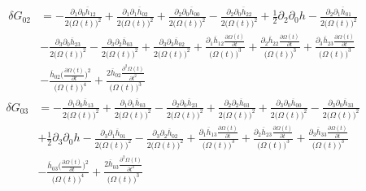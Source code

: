 \documentclass[10pt,letterpaper]{article}
\begin{document}
\begin{align}
	\delta G_{02} &= - \frac{\partial_{1}\partial_{0}\overline{h}_{12}}{2 \bigl(\Omega(t)\bigr)^2} + \frac{\partial_{1}\partial_{1}\overline{h}_{02}}{2 \bigl(\Omega(t)\bigr)^2} + \frac{\partial_{2}\partial_{0}\overline{h}_{00}}{2 \bigl(\Omega(t)\bigr)^2} -  \frac{\partial_{2}\partial_{0}\overline{h}_{22}}{2 \bigl(\Omega(t)\bigr)^2} + \tfrac{1}{2} \partial_{2}\partial_{0}h -  \frac{\partial_{2}\partial_{1}\overline{h}_{01}}{2 \bigl(\Omega(t)\bigr)^2}\\
& -  \frac{\partial_{3}\partial_{0}\overline{h}_{23}}{2 \bigl(\Omega(t)\bigr)^2} -  \frac{\partial_{3}\partial_{2}\overline{h}_{03}}{2 \bigl(\Omega(t)\bigr)^2} + \frac{\partial_{3}\partial_{3}\overline{h}_{02}}{2 \bigl(\Omega(t)\bigr)^2} + \frac{\partial_{1}\overline{h}_{12} \frac{\partial \Omega(t)}{\partial t}}{\bigl(\Omega(t)\bigr)^3} + \frac{\partial_{2}\overline{h}_{22} \frac{\partial \Omega(t)}{\partial t}}{\bigl(\Omega(t)\bigr)^3} + \frac{\partial_{3}\overline{h}_{23} \frac{\partial \Omega(t)}{\partial t}}{\bigl(\Omega(t)\bigr)^3} \\
&-  \frac{\overline{h}_{02} \bigl(\frac{\partial \Omega(t)}{\partial t}\bigr)^2}{\bigl(\Omega(t)\bigr)^4} + \frac{2 \overline{h}_{02} \frac{\partial^{2}\Omega(t)}{\partial t^{2}}}{\bigl(\Omega(t)\bigr)^3}
\end{align}
\begin{align}
	\delta G_{03} &= - \frac{\partial_{1}\partial_{0}\overline{h}_{13}}{2 \bigl(\Omega(t)\bigr)^2} + \frac{\partial_{1}\partial_{1}\overline{h}_{03}}{2 \bigl(\Omega(t)\bigr)^2} -  \frac{\partial_{2}\partial_{0}\overline{h}_{23}}{2 \bigl(\Omega(t)\bigr)^2} + \frac{\partial_{2}\partial_{2}\overline{h}_{03}}{2 \bigl(\Omega(t)\bigr)^2} + \frac{\partial_{3}\partial_{0}\overline{h}_{00}}{2 \bigl(\Omega(t)\bigr)^2} -  \frac{\partial_{3}\partial_{0}\overline{h}_{33}}{2 \bigl(\Omega(t)\bigr)^2} \\
&+ \tfrac{1}{2} \partial_{3}\partial_{0}h -  \frac{\partial_{3}\partial_{1}\overline{h}_{01}}{2 \bigl(\Omega(t)\bigr)^2} -  \frac{\partial_{3}\partial_{2}\overline{h}_{02}}{2 \bigl(\Omega(t)\bigr)^2} + \frac{\partial_{1}\overline{h}_{13} \frac{\partial \Omega(t)}{\partial t}}{\bigl(\Omega(t)\bigr)^3} + \frac{\partial_{2}\overline{h}_{23} \frac{\partial \Omega(t)}{\partial t}}{\bigl(\Omega(t)\bigr)^3} + \frac{\partial_{3}\overline{h}_{33} \frac{\partial \Omega(t)}{\partial t}}{\bigl(\Omega(t)\bigr)^3} \\
&-  \frac{\overline{h}_{03} \bigl(\frac{\partial \Omega(t)}{\partial t}\bigr)^2}{\bigl(\Omega(t)\bigr)^4} + \frac{2 \overline{h}_{03} \frac{\partial^{2}\Omega(t)}{\partial t^{2}}}{\bigl(\Omega(t)\bigr)^3}
\end{align}
\end{document}
